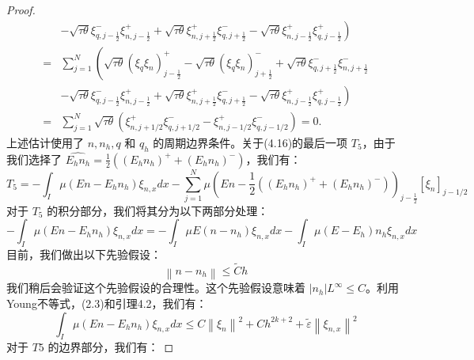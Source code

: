 \begin{proof}
\begin{equation}
\begin{split}
            & \left.-\sqrt{\tau \theta} \xi_{q, j-\frac{1}{2}}^{-} \xi_{n, j-\frac{1}{2}}^{+}+\sqrt{\tau \theta} \xi_{n, j+\frac{1}{2}}^{+} \xi_{q, j+\frac{1}{2}}^{-}-\sqrt{\tau \theta} \xi_{n, j-\frac{1}{2}}^{+} \xi_{q, j-\frac{1}{2}}^{+}\right)  \\
            =      & \sum_{j=1}^{N}\left(\sqrt{\tau \theta}\left(\xi_{q} \xi_{n}\right)_{j-\frac{1}{2}}^{+}-\sqrt{\tau \theta}\left(\xi_{q} \xi_{n}\right)_{j+\frac{1}{2}}^{-}+\sqrt{\tau \theta} \xi_{q, j+\frac{1}{2}}^{-} \xi_{n, j+\frac{1}{2}}^{-}\right. \\
            & \left.-\sqrt{\tau \theta} \xi_{q, j-\frac{1}{2}}^{-} \xi_{n, j-\frac{1}{2}}^{+}+\sqrt{\tau \theta} \xi_{n, j+\frac{1}{2}}^{+} \xi_{q, j+\frac{1}{2}}^{-}-\sqrt{\tau \theta} \xi_{n, j-\frac{1}{2}}^{+} \xi_{q, j-\frac{1}{2}}^{+}\right)  \\
            =      & \sum_{j=1}^{N} \sqrt{\tau \theta}\left(\xi_{n, j+1 / 2}^{+} \xi_{q, j+1 / 2}^{-}-\xi_{n, j-1 / 2}^{+} \xi_{q, j-1 / 2}^{-}\right)=0 .
        \end{split}
    \end{equation}
    上述估计使用了 $n, n_{h}, q$ 和 $q_{h}$ 的周期边界条件。关于(4.16)的最后一项 $T_{5}$，由于我们选择了 $\widehat{E_{h} n_{h}}=\frac{1}{2}\left(\left(E_{h} n_{h}\right)^{+}+\left(E_{h} n_{h}\right)^{-}\right)$，我们有：
    \begin{equation}
        T_{5}=-\int_{I} \mu\left(E n-E_{h} n_{h}\right) \xi_{n, x} d x-\sum_{j=1}^{N} \mu\left(E n-\frac{1}{2}\left(\left(E_{h} n_{h}\right)^{+}+\left(E_{h} n_{h}\right)^{-}\right)\right)_{j-\frac{1}{2}}\left[\xi_{n}\right]_{j-1 / 2}
    \end{equation}
    对于 $T_{5}$ 的积分部分，我们将其分为以下两部分处理：
    $$
        -\int_{I} \mu\left(E n-E_{h} n_{h}\right) \xi_{n, x} d x=-\int_{I} \mu E\left(n-n_{h}\right) \xi_{n, x} d x-\int_{I} \mu\left(E-E_{h}\right) n_{h} \xi_{n, x} d x
    $$
    目前，我们做出以下先验假设：
    \begin{equation}
        \left\|n-n_{h}\right\| \leq \tilde{C} h
    \end{equation}
    我们稍后会验证这个先验假设的合理性。这个先验假设意味着 $\left|n_{h}\right|{L^{\infty}} \leq C$。利用Young不等式，(2.3)和引理4.2，我们有：
    \begin{equation}
        \int_{I} \mu\left(E n-E_{h} n_{h}\right) \xi_{n, x} d x \leq C\left\|\xi_{n}\right\|^{2}+C h^{2 k+2}+\tilde{\varepsilon}\left\|\xi_{n, x}\right\|^{2}
    \end{equation}
    对于 $T{5}$ 的边界部分，我们有：

\end{proof}
